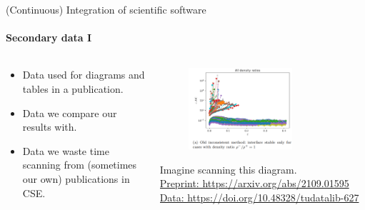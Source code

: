 \begin{frame}{(Continuous) Integration of scientific software} 
\framesubtitle{Secondary data I}
\vfill

    \begin{columns}
        \begin{column}[c]{0.5\textwidth}
            \begin{itemize}
                \item Data used for diagrams and tables in a publication.
                \item Data we compare our results with.
                \item Data we waste time scanning from (sometimes our own) publications in CSE. 
            \end{itemize}
        \end{column}
        \begin{column}[c]{0.5\textwidth}
            \centering
            \begin{figure}
                \centering
                \includegraphics[width=0.7\textwidth]{figures/secondary-data.png}
            \end{figure}
            {\footnotesize
                Imagine scanning this diagram. \\
                \href{https://arxiv.org/abs/2109.01595}{Preprint: https://arxiv.org/abs/2109.01595}\\
                \href{https://doi.org/10.48328/tudatalib-627}{Data: https://doi.org/10.48328/tudatalib-627}
            }
        \end{column}
    \end{columns}



\end{frame}

